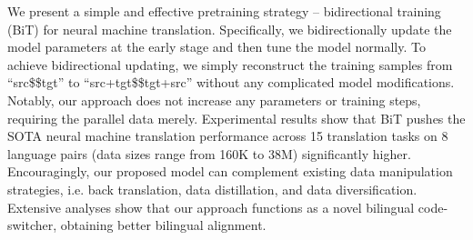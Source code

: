 We present a simple and effective pretraining strategy -- bidirectional training (BiT) for neural machine translation. Specifically, we bidirectionally update the model parameters at the early stage and then tune the model normally. To achieve bidirectional updating, we simply reconstruct the training samples from ``src\$\rightarrow\$tgt'' to  ``src+tgt\$\rightarrow\$tgt+src'' without any complicated model modifications.  Notably, our approach does not increase any parameters or training steps, requiring the parallel data merely. Experimental results show that BiT pushes the SOTA neural machine translation performance across 15 translation tasks on 8 language pairs (data sizes range from 160K to 38M) significantly higher. Encouragingly, our proposed model can complement existing data manipulation strategies, i.e. back translation, data distillation, and data diversification. Extensive analyses show that our approach functions as a novel bilingual code-switcher, obtaining better bilingual alignment.
